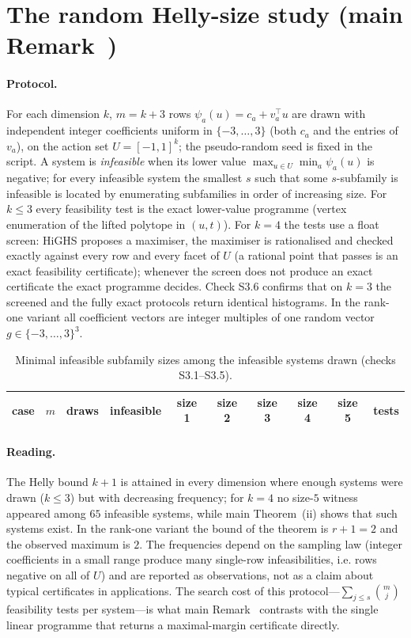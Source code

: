 \section{The random Helly-size study (main Remark~)}\label{si:random}

\paragraph{Protocol.} For each dimension $k$, $m=k+3$ rows $\psi_a(u)=c_a+v_a^\top u$ are drawn with independent integer coefficients uniform in $\{-3,\dots,3\}$ (both $c_a$ and the entries of $v_a$), on the action set $U=[-1,1]^k$; the pseudo-random seed is fixed in the script. A system is \emph{infeasible} when its lower value $\max_{u\in U}\min_a\psi_a(u)$ is negative; for every infeasible system the smallest $s$ such that some $s$-subfamily is infeasible is located by enumerating subfamilies in order of increasing size. For $k\le3$ every feasibility test is the exact lower-value programme (vertex enumeration of the lifted polytope in $(u,t)$). For $k=4$ the tests use a float screen: HiGHS proposes a maximiser, the maximiser is rationalised and checked exactly against every row and every facet of $U$ (a rational point that passes is an exact feasibility certificate); whenever the screen does not produce an exact certificate the exact programme decides. Check S3.6 confirms that on $k=3$ the screened and the fully exact protocols return identical histograms. In the rank-one variant all coefficient vectors are integer multiples of one random vector $g\in\{-3,\dots,3\}^3$.

\begin{table}[H]
\centering\footnotesize
\caption{Minimal infeasible subfamily sizes among the infeasible systems drawn (checks S3.1--S3.5).}
\begin{tabular}{lccccccccl}
\toprule
case & $m$ & draws & infeasible & size 1 & size 2 & size 3 & size 4 & size 5 & tests\\
\midrule

\bottomrule
\end{tabular}
\end{table}

\paragraph{Reading.} The Helly bound $k+1$ is attained in every dimension where enough systems were drawn ($k\le3$) but with decreasing frequency; for $k=4$ no size-$5$ witness appeared among $65$ infeasible systems, while main Theorem~(ii) shows that such systems exist. In the rank-one variant the bound of the theorem is $r+1=2$ and the observed maximum is $2$. The frequencies depend on the sampling law (integer coefficients in a small range produce many single-row infeasibilities, i.e. rows negative on all of $U$) and are reported as observations, not as a claim about typical certificates in applications. The search cost of this protocol---$\sum_{j\le s}\binom{m}{j}$ feasibility tests per system---is what main Remark~ contrasts with the single linear programme that returns a maximal-margin certificate directly.
